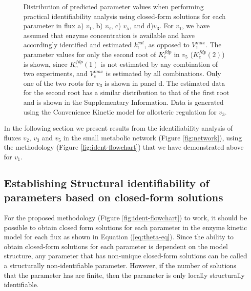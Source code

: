 \documentclass[10pt]{article}
\begin{document}
	\begin{figure}[!tbhp]
		\caption{Distribution of predicted parameter values when performing practical identifiability analysis using closed-form solutions for each parameter in flux a) $v_1$, b) $v_2$, c) $v_5$, and d)$v_3$. For $v_1$, we have assumed that enzyme concentration is available and have accordingly identified and estimated $k_1^{cat}$, as opposed to $V_1^{max}$. The parameter values for only the second root of $K_e^{fdp}$ in $v_5$ ($K_e^{fdp}(2)$) is shown, since $K_e^{fdp}(1)$ is not estimated by any combination of two experiments, and $V_e^{max}$ is estimated by all combinations. Only one of the two roots for $v_3$ is shown in panel d. The estimated data for the second root has a similar distribution to that of the first root and is shown in the Supplementary Information. Data is generated using the Convenience Kinetic model for allosteric regulation for $v_3$.}\label{fig:ident_values}
	\end{figure}
	
	In the following section we present results from the identifiability analysis of fluxes $v_2$, $v_3$ and $v_5$ in the small metabolic network (Figure \ref{fig:network}), using the methodology (Figure \ref{fig:ident-flowchart}) that we have demonstrated above for $v_1$. 
	
	\subsection{Establishing Structural identifiability of parameters based on closed-form solutions}\label{sec:proof}
	For the proposed methodology (Figure \ref{fig:ident-flowchart}) to work, it should be possible to obtain closed form solutions for each parameter in the enzyme kinetic model for each flux as shown in Equation (\ref{eq:theta-eq}). Since the ability to obtain closed-form solutions for each parameter is dependent on the model structure, any parameter that has non-unique closed-form solutions can be called a structurally non-identifiable parameter. However, if the number of solutions that the parameter has are finite, then the parameter is only locally structurally identifiable. 
	
\end{document}
